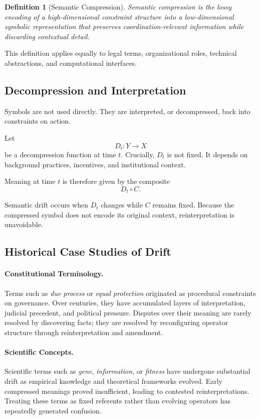 \documentclass[11pt]{article}
\newtheorem{definition}{Definition}
\begin{document}
\begin{definition}[Semantic Compression]
Semantic compression is the lossy encoding of a high-dimensional constraint
structure into a low-dimensional symbolic representation that preserves
coordination-relevant information while discarding contextual detail.
\end{definition}

This definition applies equally to legal terms, organizational roles, technical
abstractions, and computational interfaces.

\subsection{Decompression and Interpretation}

Symbols are not used directly. They are interpreted, or decompressed, back into
constraints on action.

Let
\[
D_t : Y \to X
\]
be a decompression function at time $t$. Crucially, $D_t$ is not fixed. It
depends on background practices, incentives, and institutional context.

Meaning at time $t$ is therefore given by the composite
\[
D_t \circ C.
\]

Semantic drift occurs when $D_t$ changes while $C$ remains fixed. Because the
compressed symbol does not encode its original context, reinterpretation is
unavoidable.

\subsection{Historical Case Studies of Drift}

\paragraph{Constitutional Terminology.}
Terms such as \emph{due process} or \emph{equal protection} originated as
procedural constraints on governance. Over centuries, they have accumulated
layers of interpretation, judicial precedent, and political pressure. Disputes
over their meaning are rarely resolved by discovering facts; they are resolved by
reconfiguring operator structure through reinterpretation and amendment.

\paragraph{Scientific Concepts.}
Scientific terms such as \emph{gene}, \emph{information}, or \emph{fitness} have
undergone substantial drift as empirical knowledge and theoretical frameworks
evolved. Early compressed meanings proved insufficient, leading to contested
reinterpretations. Treating these terms as fixed referents rather than evolving
operators has repeatedly generated confusion.
\end{document}
